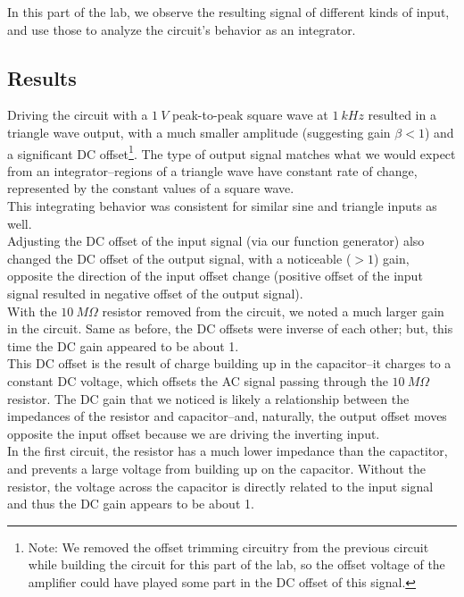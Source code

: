 \documentclass[11pt]{article}
\begin{document}
In this part of the lab, we observe the resulting signal of different kinds of input, and use those to analyze the circuit's behavior as an integrator.\\


\subsection{Results}

Driving the circuit with a $1\ V$ peak-to-peak square wave at $1\ kHz$ resulted in a triangle wave output, with a much smaller amplitude (suggesting gain $\beta < 1$) and a significant DC offset\footnote{Note: We removed the offset trimming circuitry from the previous circuit while building the circuit for this part of the lab, so the offset voltage of the amplifier could have played some part in the DC offset of this signal.}. The type of output signal matches what we would expect from an integrator--regions of a triangle wave have constant rate of change, represented by the constant values of a square wave.\\

This integrating behavior was consistent for similar sine and triangle inputs as well.\\

Adjusting the DC offset of the input signal (via our function generator) also changed the DC offset of the output signal, with a noticeable ($>1$) gain, opposite the direction of the input offset change (positive offset of the input signal resulted in negative offset of the output signal). \\

With the $10\ M \Omega$ resistor removed from the circuit, we noted a much larger gain in the circuit. Same as before, the DC offsets were inverse of each other; but, this time the DC gain appeared to be about 1. \\

This DC offset is the result of charge building up in the capacitor--it charges to a constant DC voltage, which offsets the AC signal passing through the $10\ M \Omega$ resistor. The DC gain that we noticed is likely a relationship between the impedances of the resistor and capacitor--and, naturally, the output offset moves opposite the input offset because we are driving the inverting input.\\

In the first circuit, the resistor has a much lower impedance than the capactitor, and prevents a large voltage from building up on the capacitor. Without the resistor, the voltage across the capacitor is directly related to the input signal and thus the DC gain appears to be about 1. \\
\end{document}
